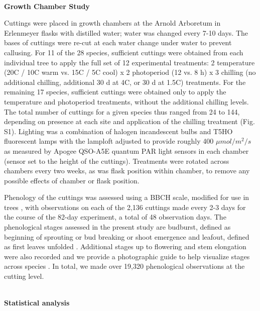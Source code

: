 \documentclass[11pt]{article}
\begin{document}
\vspace{1ex}\\
\noindent \textbf{Growth Chamber Study}

\noindent Cuttings were placed in growth chambers at the Arnold Arboretum in Erlenmeyer flasks with distilled water; water was changed every 7-10 days. The bases of cuttings were re-cut at each water change under water to prevent callusing. For 11 of the 28 species, sufficient cuttings were obtained from each individual tree to apply the full set of 12 experimental treatments: 2 temperature (20\degree C / 10\degree C warm vs. 15\degree C / 5\degree C cool) x 2 photoperiod (12 vs. 8 h) x 3 chilling (no additional chilling, additional 30 d at 4\degree C, or 30 d at 1.5\degree C) treatments. For the remaining 17 species, sufficient cuttings were obtained only to apply the temperature and photoperiod treatments, without the additional chilling levels. The total number of cuttings for a given species thus ranged from 24 to 144, depending on presence at each site and application of the chilling treatment (Fig. S1). Lighting was a combination of halogen incandescent bulbs and T5HO fluorescent lamps with the lamploft adjusted to provide roughly 400 $\mu mol/m^{2}/s$ as measured by Apogee QSO-A5E quantum PAR light sensors in each chamber (sensor set to the height of the cuttings). Treatments were rotated across chambers every two weeks, as was flask position within chamber, to remove any possible effects of chamber or flask position. 

Phenology of the cuttings was assessed using a BBCH scale, modified for use in trees \citep{Finn:2007}, with observations on each of the 2,136 cuttings made every 2-3 days for the course of the 82-day experiment, a total of 48 observation days. The phenological stages assessed in the present study are budburst, defined as beginning of sprouting or bud breaking or shoot emergence \citep[Code 07 in][]{Finn:2007} and leafout, defined as first leaves unfolded \citep[Code 11 in][]{Finn:2007}. Additional stages up to flowering and stem elongation were also recorded and we provide a photographic guide to help visualize stages across species \citep{bbchguide}. In total, we made over 19,320 phenological observations at the cutting level.


\vspace{1ex}\\
\noindent \textbf{Statistical analysis}
\end{document}
